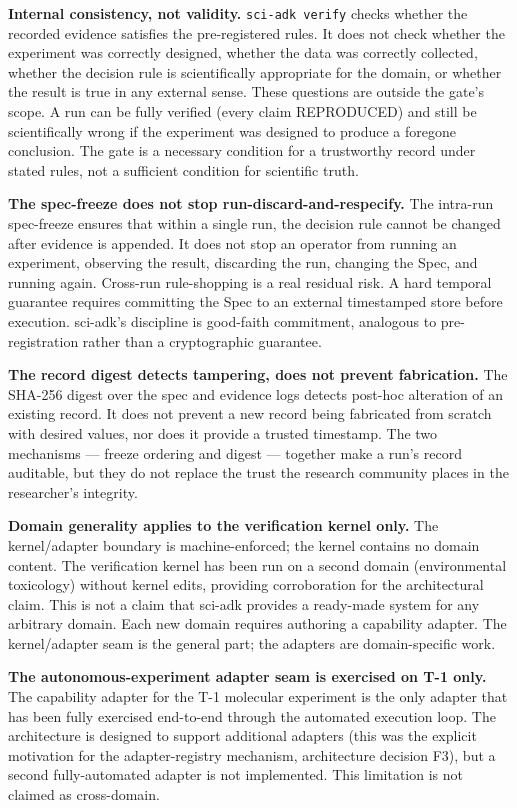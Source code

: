 \documentclass[11pt]{article}
\begin{document}
\textbf{Internal consistency, not validity.} \texttt{sci-adk verify} checks whether the recorded evidence satisfies the pre-registered rules. It does not check whether the experiment was correctly designed, whether the data was correctly collected, whether the decision rule is scientifically appropriate for the domain, or whether the result is true in any external sense. These questions are outside the gate's scope. A run can be fully verified (every claim REPRODUCED) and still be scientifically wrong if the experiment was designed to produce a foregone conclusion. The gate is a necessary condition for a trustworthy record under stated rules, not a sufficient condition for scientific truth.

\textbf{The spec-freeze does not stop run-discard-and-respecify.} The intra-run spec-freeze ensures that within a single run, the decision rule cannot be changed after evidence is appended. It does not stop an operator from running an experiment, observing the result, discarding the run, changing the Spec, and running again. Cross-run rule-shopping is a real residual risk. A hard temporal guarantee requires committing the Spec to an external timestamped store before execution. sci-adk's discipline is good-faith commitment, analogous to pre-registration rather than a cryptographic guarantee.

\textbf{The record digest detects tampering, does not prevent fabrication.} The SHA-256 digest over the spec and evidence logs detects post-hoc alteration of an existing record. It does not prevent a new record being fabricated from scratch with desired values, nor does it provide a trusted timestamp. The two mechanisms --- freeze ordering and digest --- together make a run's record auditable, but they do not replace the trust the research community places in the researcher's integrity.

\textbf{Domain generality applies to the verification kernel only.} The kernel/adapter boundary is machine-enforced; the kernel contains no domain content. The verification kernel has been run on a second domain (environmental toxicology) without kernel edits, providing corroboration for the architectural claim. This is not a claim that sci-adk provides a ready-made system for any arbitrary domain. Each new domain requires authoring a capability adapter. The kernel/adapter seam is the general part; the adapters are domain-specific work.

\textbf{The autonomous-experiment adapter seam is exercised on T-1 only.} The capability adapter for the T-1 molecular experiment is the only adapter that has been fully exercised end-to-end through the automated execution loop. The architecture is designed to support additional adapters (this was the explicit motivation for the adapter-registry mechanism, architecture decision F3), but a second fully-automated adapter is not implemented. This limitation is not claimed as cross-domain.
\end{document}
